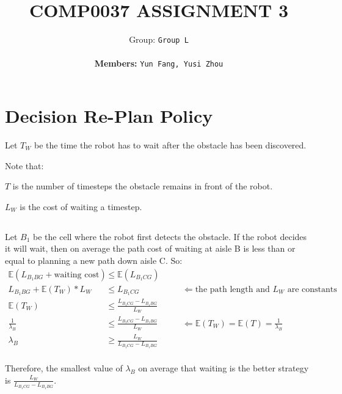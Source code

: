 \documentclass{article}
\title{COMP0037 ASSIGNMENT 3}
\author{
 Group: \texttt{Group L}\\\\
 \textbf{Members:} \texttt{Yun Fang, Yusi Zhou}
}
\begin{document}
\maketitle


\section{Decision Re-Plan Policy}

Let $T_{W}$ be the time the robot has to wait after the obstacle has been discovered.

Note that:

$T$ is the number of timesteps the obstacle remains in front of the robot. 

$L_{W}$ is the cost of waiting a timestep.

\subsection{}

Let $B_{1}$ be the cell where the robot first detects the obstacle.
If the robot decides it will wait, then on average the path cost of waiting at aisle B is less than or equal to planning a new path down aisle C. So:
\begin{align*}
\mathbb{E}(L_{B_{1}BG} + \text{waiting cost}) &\leq \mathbb{E}(L_{B_{1}CG})	\\
L_{B_{1}BG} + \mathbb{E}(T_{W}) * L_{W} &\leq L_{B_{1}CG} 	&\quad	&\Leftarrow \text{the path length and $L_{W}$ are constants}	\\
\mathbb{E}(T_{W}) &\leq \frac{L_{B_{1}CG} - L_{B_{1}BG} } {L_{W}}	\\
\frac{1}{\lambda_{B}} &\leq \frac{L_{B_{1}CG} - L_{B_{1}BG} } {L_{W}}	&\quad	&\Leftarrow  \mathbb{E}(T_{W}) = \mathbb{E}(T) = \frac{1}{\lambda_{B}} \\
\lambda_{B} &\geq \frac {L_{W}} {L_{B_{1}CG} - L_{B_{1}BG} } 	\\
\end{align*}

Therefore, the smallest value of $\lambda_{B}$ on average that waiting is the better strategy is $ \frac {L_{W}} {L_{B_{1}CG} - L_{B_{1}BG} } $.

\subsection{}
\end{document}
